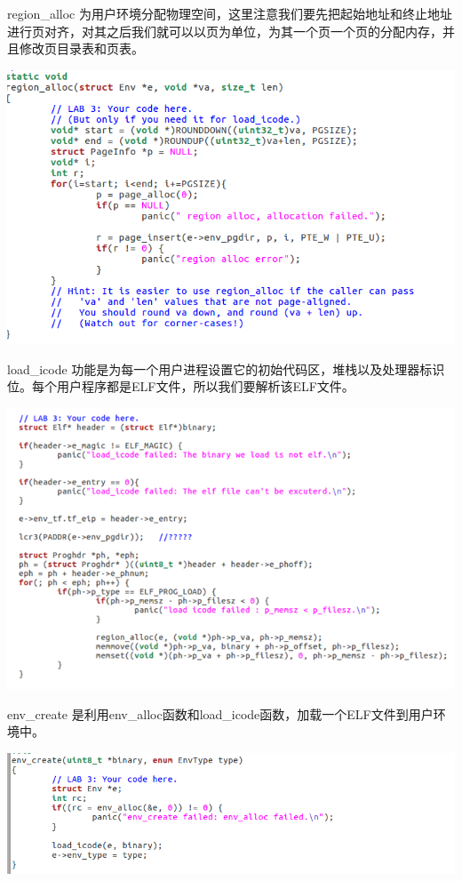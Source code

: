 \begin{ExerciseList}
  region\_alloc 为用户环境分配物理空间，这里注意我们要先把起始地址和终止地址进行页对齐，对其之后我们就可以以页为单位，为其一个页一个页的分配内存，并且修改页目录表和页表。

  \includegraphics[width=6in]{figures/lab2/image56.png}

  load\_icode 功能是为每一个用户进程设置它的初始代码区，堆栈以及处理器标识位。每个用户程序都是ELF文件，所以我们要解析该ELF文件。

  \includegraphics[width=6in]{figures/lab2/image57.png}

  env\_create 是利用env\_alloc函数和load\_icode函数，加载一个ELF文件到用户环境中。

  \includegraphics[width=6in]{figures/lab2/image58.png}


\end{ExerciseList}
